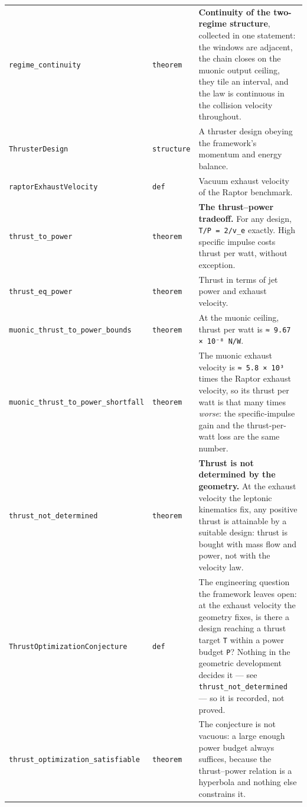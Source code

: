 \documentclass[11pt,a4paper]{article}
\begin{document}
\begin{center}
\begin{longtable}{@{}p{}p{}p{}@{}}
\texttt{regime\_\allowbreak{}continuity} & \texttt{theorem} & \small \textbf{Continuity of the two-regime structure}, collected in one statement: the windows are adjacent, the chain closes on the muonic output ceiling, they tile an interval, and the law is continuous in the collision velocity throughout. \\
\texttt{ThrusterDesign} & \texttt{structure} & \small A thruster design obeying the framework's momentum and energy balance. \\
\texttt{raptorExhaustVelocity} & \texttt{def} & \small Vacuum exhaust velocity of the Raptor benchmark. \\
\texttt{thrust\_\allowbreak{}to\_\allowbreak{}power} & \texttt{theorem} & \small \textbf{The thrust–power tradeoff.}  For any design, \texttt{T/P = 2/v\_\allowbreak{}e} exactly.  High specific impulse costs thrust per watt, without exception. \\
\texttt{thrust\_\allowbreak{}eq\_\allowbreak{}power} & \texttt{theorem} & \small Thrust in terms of jet power and exhaust velocity. \\
\texttt{muonic\_\allowbreak{}thrust\_\allowbreak{}to\_\allowbreak{}power\_\allowbreak{}bounds} & \texttt{theorem} & \small At the muonic ceiling, thrust per watt is \texttt{≈ 9.67 × 10⁻⁸ N/W}. \\
\texttt{muonic\_\allowbreak{}thrust\_\allowbreak{}to\_\allowbreak{}power\_\allowbreak{}shortfall} & \texttt{theorem} & \small The muonic exhaust velocity is \texttt{≈ 5.8 × 10³} times the Raptor exhaust velocity, so its thrust per watt is that many times \emph{worse}: the specific-impulse gain and the thrust-per-watt loss are the same number. \\
\texttt{thrust\_\allowbreak{}not\_\allowbreak{}determined} & \texttt{theorem} & \small \textbf{Thrust is not determined by the geometry.}  At the exhaust velocity the leptonic kinematics fix, any positive thrust is attainable by a suitable design: thrust is bought with mass flow and power, not with the velocity law. \\
\texttt{ThrustOptimizationConjecture} & \texttt{def} & \small The engineering question the framework leaves open: at the exhaust velocity the geometry fixes, is there a design reaching a thrust target \texttt{T} within a power budget \texttt{P}?  Nothing in the geometric development decides it — see \texttt{thrust\_\allowbreak{}not\_\allowbreak{}determined} — so it is recorded, not proved. \\
\texttt{thrust\_\allowbreak{}optimization\_\allowbreak{}satisfiable} & \texttt{theorem} & \small The conjecture is not vacuous: a large enough power budget always suffices, because the thrust–power relation is a hyperbola and nothing else constrains it. \\

\end{longtable}
\end{center}
\end{document}

